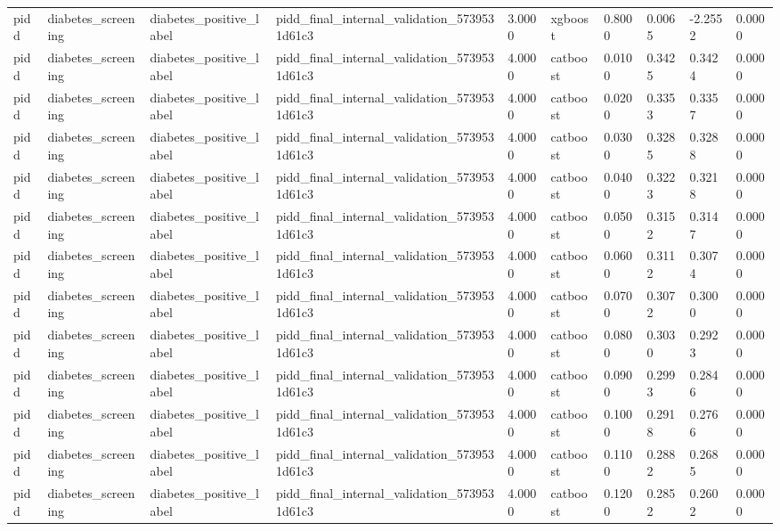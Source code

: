 \begin{tabular}{llllllllll}
pidd & diabetes\_screening & diabetes\_positive\_label & pidd\_final\_internal\_validation\_5739531d61c3 & 3.0000 & xgboost & 0.8000 & 0.0065 & -2.2552 & 0.0000 \\
pidd & diabetes\_screening & diabetes\_positive\_label & pidd\_final\_internal\_validation\_5739531d61c3 & 4.0000 & catboost & 0.0100 & 0.3425 & 0.3424 & 0.0000 \\
pidd & diabetes\_screening & diabetes\_positive\_label & pidd\_final\_internal\_validation\_5739531d61c3 & 4.0000 & catboost & 0.0200 & 0.3353 & 0.3357 & 0.0000 \\
pidd & diabetes\_screening & diabetes\_positive\_label & pidd\_final\_internal\_validation\_5739531d61c3 & 4.0000 & catboost & 0.0300 & 0.3285 & 0.3288 & 0.0000 \\
pidd & diabetes\_screening & diabetes\_positive\_label & pidd\_final\_internal\_validation\_5739531d61c3 & 4.0000 & catboost & 0.0400 & 0.3223 & 0.3218 & 0.0000 \\
pidd & diabetes\_screening & diabetes\_positive\_label & pidd\_final\_internal\_validation\_5739531d61c3 & 4.0000 & catboost & 0.0500 & 0.3152 & 0.3147 & 0.0000 \\
pidd & diabetes\_screening & diabetes\_positive\_label & pidd\_final\_internal\_validation\_5739531d61c3 & 4.0000 & catboost & 0.0600 & 0.3112 & 0.3074 & 0.0000 \\
pidd & diabetes\_screening & diabetes\_positive\_label & pidd\_final\_internal\_validation\_5739531d61c3 & 4.0000 & catboost & 0.0700 & 0.3072 & 0.3000 & 0.0000 \\
pidd & diabetes\_screening & diabetes\_positive\_label & pidd\_final\_internal\_validation\_5739531d61c3 & 4.0000 & catboost & 0.0800 & 0.3030 & 0.2923 & 0.0000 \\
pidd & diabetes\_screening & diabetes\_positive\_label & pidd\_final\_internal\_validation\_5739531d61c3 & 4.0000 & catboost & 0.0900 & 0.2993 & 0.2846 & 0.0000 \\
pidd & diabetes\_screening & diabetes\_positive\_label & pidd\_final\_internal\_validation\_5739531d61c3 & 4.0000 & catboost & 0.1000 & 0.2918 & 0.2766 & 0.0000 \\
pidd & diabetes\_screening & diabetes\_positive\_label & pidd\_final\_internal\_validation\_5739531d61c3 & 4.0000 & catboost & 0.1100 & 0.2882 & 0.2685 & 0.0000 \\
pidd & diabetes\_screening & diabetes\_positive\_label & pidd\_final\_internal\_validation\_5739531d61c3 & 4.0000 & catboost & 0.1200 & 0.2852 & 0.2602 & 0.0000 \\

\end{tabular}
